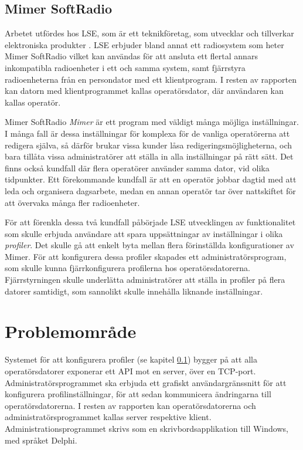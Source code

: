 \subsection{Mimer SoftRadio}
\label{sec:intro:mimer}
Arbetet utfördes hos LSE, som är ett teknikföretag, som utvecklar och tillverkar elektroniska produkter \cite{Ehne}. LSE erbjuder bland annat ett radiosystem som heter Mimer SoftRadio vilket kan användas för att ansluta ett flertal annars inkompatibla radioenheter i ett och samma system, samt fjärrstyra radioenheterna från en persondator med ett klientprogram. I resten av rapporten kan datorn med klientprogrammet kallas operatörsdator, där användaren kan kallas operatör.

Mimer SoftRadio \textit{Mimer} är ett program med väldigt många möjliga inställningar. I många fall är dessa inställningar för komplexa för de vanliga operatörerna att redigera själva, så därför brukar vissa kunder låsa redigeringsmöjligheterna, och bara tillåta vissa administratörer att ställa in alla inställningar på rätt sätt. Det finns också kundfall där flera operatörer använder samma dator, vid olika tidpunkter. Ett förekommande kundfall är att en operatör jobbar dagtid med att leda och organisera dagsarbete, medan en annan operatör tar över nattskiftet för att övervaka många fler radioenheter.

För att förenkla dessa två kundfall påbörjade LSE utvecklingen av funktionalitet som skulle erbjuda användare att spara uppsättningar av inställningar i olika \textit{profiler}. Det skulle gå att enkelt byta mellan flera förinställda konfigurationer av Mimer. För att konfigurera dessa profiler skapades ett administratörsprogram, som skulle kunna fjärrkonfigurera profilerna hos operatörsdatorerna. Fjärrstyrningen skulle underlätta administratörer att ställa in profiler på flera datorer samtidigt, som sannolikt skulle innehålla liknande inställningar.

\section{Problemområde}
\label{sec:intro:problemområde}
Systemet för att konfigurera profiler (se kapitel \ref{sec:intro:mimer}) bygger på att alla operatörsdatorer exponerar ett API mot en server, över en TCP-port. Administratörsprogrammet ska erbjuda ett grafiskt användargränssnitt för att konfigurera profilinställningar, för att sedan kommunicera ändringarna till operatörsdatorerna. I resten av rapporten kan operatörsdatorerna och administratörsprogrammet kallas server respektive klient. Administrationsprogrammet skrivs som en skrivbordsapplikation till Windows, med språket Delphi.

